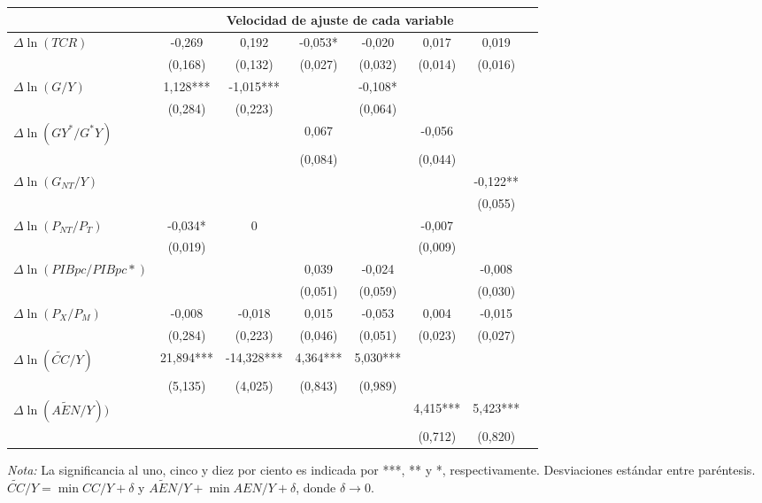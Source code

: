 \documentclass[12pt,letterpaper]{article}
\begin{document}
\begin{table}
\begin{center}
{\begin{tabular}{lccccccc}
\hline													
									&	\multicolumn{6}{c}{Velocidad de ajuste de cada variable}				\\
\hline													
$\Delta \ln (T	CR)$						&-0,269 		&	0,192			&	-0,053*	&	-0,020		&	0,017		&	0,019	\\
														&	(0,168)	&	(0,132)		&	(0,027)	&	(0,032)	&(0,014)		&(0,016)	\\
$\Delta \ln (G/Y)$						&1,128***	&-1,015***		&					&	-0,108*	&					&			\\
														&	(0,284)	&	(0,223)		&					&	(0,064)	&					&			\\
$\Delta\ln(GY^*/G^*Y)$				&					&						&	0,067		&					&	-0,056		&			\\
														&					&						&	(0,084)	&					&(0,044)		&			\\
$\Delta\ln(G_{NT}/Y)$				&					&						&					&					&					&-0,122**	\\
														&					&						&					&					&					&(0,055)	\\
$\Delta\ln(P_{NT}/P_T)$			&	-0,034*	&	0					&					&					&	-0,007		&			\\
														&(0,019)		&						&					&					&	(0,009)	&			\\
$\Delta\ln(PIBpc/PIBpc*)$		&					&						&	0,039		&	-0,024		&					&-0,008		\\
														&					&						&	(0,051)	&	(0,059)	&					&(0,030)	\\
$\Delta\ln(P_X/P_M)$					&-0,008		&-0,018			&	0,015		&	-0,053		&	0,004		&-0,015		\\
														&	(0,284)	&(0,223)			&	(0,046)	&	(0,051)	&(0,023)		&(0,027)	\\
$\Delta\ln(\tilde{CC}/Y)$		&21,894***	&-14,328***	&4,364***	&5,030***	&					&			\\
														&(5,135)		&	(4,025)		&	(0,843)	&	(0,989)	&					&			\\
$\Delta\ln(\tilde{AEN}/Y))$	&					&						&					&					&4,415***	&5,423***	\\
														&					&						&					&					&(0,712)		&(0,820)	\\
\hline													
\hline													
\end{tabular}%
}	
\end{center}
\begin{scriptsize}
\emph{Nota:} La significancia al uno, cinco y diez por ciento es indicada por ***, ** y *, respectivamente. Desviaciones estándar entre paréntesis. $\tilde{CC}/Y = \min CC/Y + \delta$ y $\tilde{AEN}/Y + \min AEN/Y + \delta $, donde $\delta \rightarrow 0$.
\end{scriptsize}						
\label{beercoi}		
\end{table}	
\end{document}
